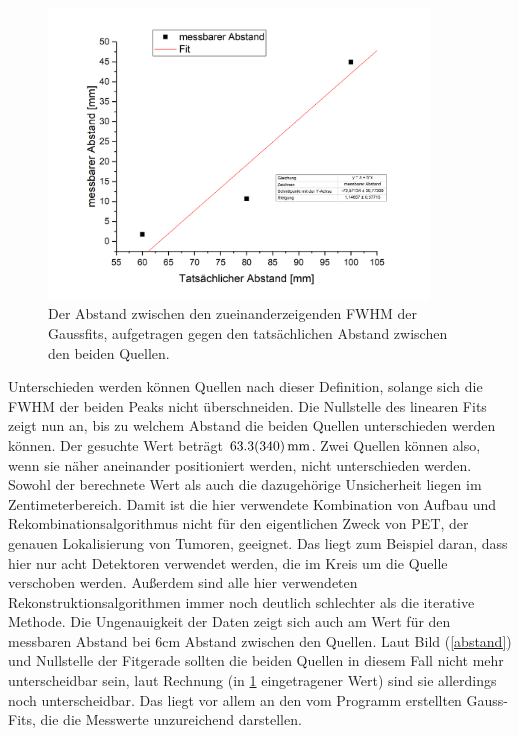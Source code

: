 \begin{figure}[h]
	\centering
	\includegraphics[width=0.9\textwidth]{abstand_fit.png}
	\caption{Der Abstand zwischen den zueinanderzeigenden FWHM der Gaussfits, aufgetragen gegen den tatsächlichen Abstand zwischen den beiden Quellen.}
	\label{abstand_fit}
\end{figure}

Unterschieden werden können Quellen nach dieser Definition, solange sich die FWHM der beiden Peaks nicht überschneiden. Die Nullstelle des linearen Fits zeigt nun an, bis zu welchem Abstand die beiden Quellen unterschieden werden können. Der gesuchte Wert beträgt $\SI{63,3\pm34,0}{mm}$. Zwei Quellen können also, wenn sie näher aneinander positioniert werden, nicht unterschieden werden. Sowohl der berechnete Wert als auch die dazugehörige Unsicherheit liegen im Zentimeterbereich. Damit ist die hier verwendete Kombination von Aufbau und Rekombinationsalgorithmus nicht für den eigentlichen Zweck von PET, der genauen Lokalisierung von Tumoren, geeignet. Das liegt zum Beispiel daran, dass hier nur acht Detektoren verwendet werden, die im Kreis um die Quelle verschoben werden. Außerdem sind alle hier verwendeten Rekonstruktionsalgorithmen immer noch deutlich schlechter als die iterative Methode. Die Ungenauigkeit der Daten zeigt sich auch am Wert für den messbaren Abstand bei 6cm Abstand zwischen den Quellen. Laut Bild (\cref{abstand}) und Nullstelle der Fitgerade sollten die beiden Quellen in diesem Fall nicht mehr unterscheidbar sein, laut Rechnung (in \cref{abstand_fit} eingetragener Wert) sind sie allerdings noch unterscheidbar. Das liegt vor allem an den vom Programm erstellten Gauss-Fits, die die Messwerte unzureichend darstellen.